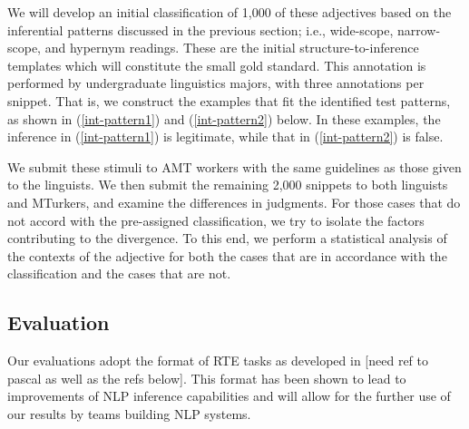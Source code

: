 \documentclass[10pt]{article}
\begin{document}
We will develop an initial classification of 1,000 of these adjectives based on the inferential patterns discussed in the previous section; i.e., wide-scope, narrow-scope, and hypernym readings. 
These are the initial structure-to-inference templates which will constitute the small gold standard. This annotation is performed by undergraduate linguistics majors, with three annotations per snippet. 
That is, we construct the examples that fit the identified test patterns, as shown in (\ref{int-pattern1}) and (\ref{int-pattern2}) below. In these examples, the inference in (\ref{int-pattern1}) is legitimate, while that in (\ref{int-pattern2}) is false. 

\vspace {-3mm}

\begin{multicols}{2}

\vspace {-6mm}

\end{multicols}
\vspace {-2mm}

 \noindent We submit these stimuli to AMT workers with the same guidelines as those given to the linguists. 
 We then submit the remaining 2,000 snippets to both linguists and MTurkers, and examine the differences in judgments. For those cases that do not accord with the pre-assigned classification, we try to isolate the factors contributing to the divergence. 
 To this end, we perform a statistical analysis of the contexts of the adjective for both the cases that are in accordance with the classification and the cases that are not. 
 

\vspace {-3mm}

\subsection{Evaluation}

\vspace {-3mm}

Our evaluations adopt the format of RTE tasks as developed in [need ref to pascal as well as the refs below]. This format has been shown to lead to improvements of NLP inference capabilities and will allow for the further use of our results by teams building NLP systems. 
\end{document}
